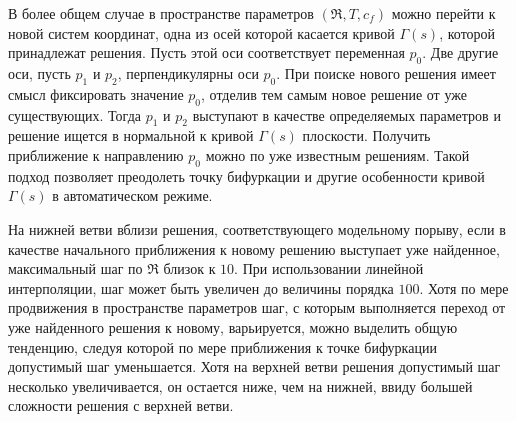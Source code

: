 В более общем случае в пространстве параметров $(\Re, T, c_f)$ можно перейти к новой систем координат, одна из осей которой касается кривой $\Gamma(s)$, которой принадлежат решения. Пусть этой оси соответствует переменная $p_0$. Две другие оси, пусть $p_1$ и $p_2$, перпендикулярны оси $p_0$. При поиске нового решения имеет смысл фиксировать значение $p_0$, отделив тем самым новое решение от уже существующих. Тогда $p_1$ и $p_2$ выступают в качестве определяемых параметров и решение ищется в нормальной к кривой $\Gamma(s)$ плоскости. Получить приближение к направлению $p_0$ можно по уже известным решениям. Такой подход позволяет преодолеть точку бифуркации и другие особенности кривой $\Gamma(s)$ в автоматическом режиме. 

На нижней ветви вблизи решения, соответствующего модельному порыву, если в качестве начального приближения к новому решению выступает уже найденное, максимальный шаг по $\Re$ близок к $10$. При использовании линейной интерполяции, шаг может быть увеличен до величины порядка $100$. Хотя по мере продвижения в пространстве параметров шаг, с которым выполняется переход от уже найденного решения к новому, варьируется, можно выделить общую тенденцию, следуя которой по мере приближения к точке бифуркации допустимый шаг уменьшается. Хотя на верхней ветви решения допустимый шаг несколько увеличивается, он остается ниже, чем на нижней, ввиду большей сложности решения с верхней ветви. 
 






